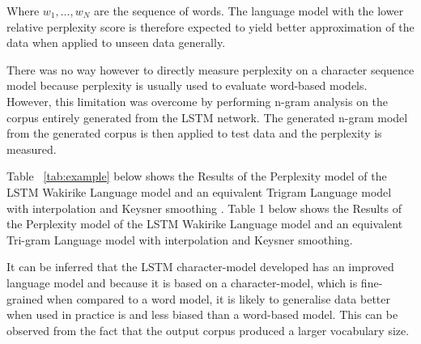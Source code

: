 Where $w_1,\dots,w_N$ are the sequence of words. The language model with the lower relative perplexity score is therefore expected to yield better approximation of the data when applied to unseen data generally.

There was no way however to directly measure perplexity on a character sequence model because perplexity is usually used to evaluate word-based models.  However, this limitation was overcome by performing n-gram analysis on the corpus entirely generated from the LSTM network. The generated n-gram model from the generated corpus is then applied to test data and the perplexity is measured.

Table ~\ref{tab:example} below shows the Results of the Perplexity model of the LSTM Wakirike Language model and an equivalent Trigram Language model with interpolation and Keysner smoothing \cite{chen1996empirical}.
Table 1 below shows the Results of the Perplexity model of the LSTM Wakirike Language model and an equivalent Tri-gram Language model with interpolation and Keysner smoothing.

It can be inferred that the LSTM character-model developed has an improved language model and because it is based on a character-model, which is fine-grained when compared to a word model, it is likely to generalise data better when used in practice is and less biased than a word-based model.  This can be observed from the fact that the output corpus produced a larger vocabulary size.
